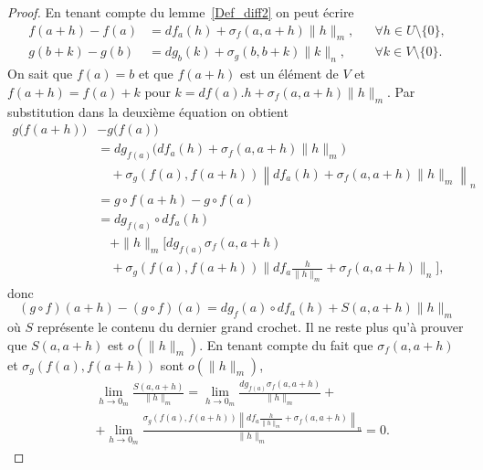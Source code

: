 \begin{proof}
	En tenant compte du lemme~\ref{Def_diff2} on peut écrire
	\begin{subequations}
		\begin{align}
			f(a+h)-f(a) & =df_a(h)+\sigma_f(a,a+h)\|h\|_m, &  & \forall h\in U\setminus \{0\},      \\
			g(b+k)-g(b) & =dg_b(k)+\sigma_g(b,b+k)\|k\|_n, &  & \forall k\in V\setminus \{0\}.
		\end{align}
	\end{subequations}
	On sait que \( f(a)=b\) et que \( f(a+h)\) est  un élément de \( V\) et \( f(a+h)=f(a)+k\) pour \( k=df(a).h+\sigma_f(a,a+h)\|h\|_m\).  Par substitution dans la deuxième équation on obtient
	\begin{equation}
		\begin{aligned}
			g\big(f(a+h)\big) & - g\big(f(a)\big)                                                                                  \\
			                  & =dg_{f(a)}\Big(df_a(h)+\sigma_f(a,a+h)\|h\|_m\Big)                                                 \\
			                  & \quad+\sigma_g\left(f(a), f(a+h)\right)\left\| df_a(h)+\sigma_f(a,a+h)\|h\|_m\right \|_n           \\
			                  & =g\circ f (a+h) - g\circ f (a)                                                                     \\
			                  & = dg_{f(a)}\circ df_a(h)                                                                           \\
			                  & \quad +\|h\|_m\Big[ dg_{f(a)}\sigma_f(a,a+h)                                                       \\
			                  & \quad+\sigma_g\left(f(a), f(a+h)\right)\big\| df_a\frac{h}{\|h\|_m}+\sigma_f(a,a+h)\big \|_n\Big],
		\end{aligned}
	\end{equation}
	donc
	\begin{equation}
		(g\circ f) (a+h) - (g\circ f) (a) = dg_f(a)\circ df_a(h) + S(a,a+h) \|h\|_m
	\end{equation}
	où \( S\) représente le contenu du dernier grand crochet. Il ne reste plus qu'à prouver que \( S(a,a+h)\) est \( o(\|h\|_m)\). En tenant compte du fait que \( \sigma_f(a,a+h)\) et \( \sigma_g\left(f(a), f(a+h)\right)\) sont \( o (\|h\|_m)\),
	\begin{equation}
		\begin{aligned}
			 & \lim_{h\to 0_m} \frac{S(a,a+h)}{\|h\|_m}= \lim_{h\to 0_m}\frac{dg_{f(a)}\sigma_f(a,a+h)}{\|h\|_m}+                              \\
			 & + \lim_{h\to 0_m}\frac{\sigma_g\left(f(a), f(a+h)\right)\left\| df_a\frac{h}{\|h\|_m}+\sigma_f(a,a+h)\right \|_n}{\|h\|_m} = 0.
		\end{aligned}
	\end{equation}
\end{proof}

